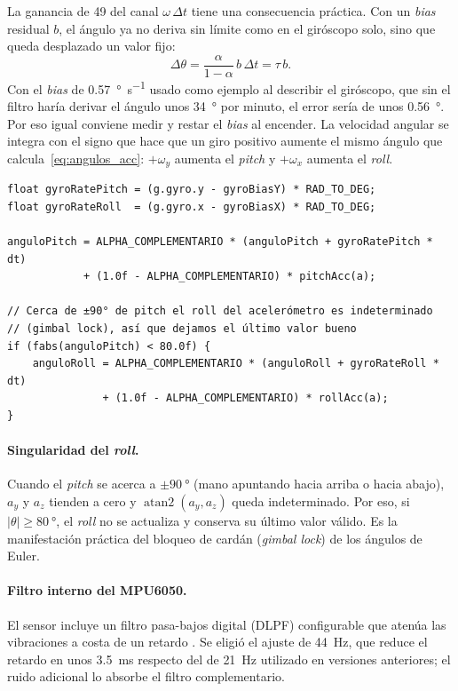 La ganancia de 49 del canal $\omega\,\Delta t$ tiene una consecuencia práctica. Con un \textit{bias} residual $b$, el ángulo ya no deriva sin límite como en el giróscopo solo, sino que queda desplazado un valor fijo:
\begin{equation}
\Delta\theta = \frac{\alpha}{1-\alpha}\,b\,\Delta t = \tau\, b .
\end{equation}
Con el \textit{bias} de \SI{0.57}{\degree\per\second} usado como ejemplo al describir el giróscopo, que sin el filtro haría derivar el ángulo unos \SI{34}{\degree} por minuto, el error sería de unos \SI{0.56}{\degree}. Por eso igual conviene medir y restar el \textit{bias} al encender. La velocidad angular se integra con el signo que hace que un giro positivo aumente el mismo ángulo que calcula~\eqref{eq:angulos_acc}: $+\omega_y$ aumenta el \textit{pitch} y $+\omega_x$ aumenta el \textit{roll}.

\begin{lstlisting}[caption={Filtro complementario en la tarea de transmisión.}, label={cod:complementario}]
float gyroRatePitch = (g.gyro.y - gyroBiasY) * RAD_TO_DEG;
float gyroRateRoll  = (g.gyro.x - gyroBiasX) * RAD_TO_DEG;

anguloPitch = ALPHA_COMPLEMENTARIO * (anguloPitch + gyroRatePitch * dt)
            + (1.0f - ALPHA_COMPLEMENTARIO) * pitchAcc(a);

// Cerca de ±90° de pitch el roll del acelerómetro es indeterminado
// (gimbal lock), así que dejamos el último valor bueno
if (fabs(anguloPitch) < 80.0f) {
    anguloRoll = ALPHA_COMPLEMENTARIO * (anguloRoll + gyroRateRoll * dt)
               + (1.0f - ALPHA_COMPLEMENTARIO) * rollAcc(a);
}
\end{lstlisting}

\paragraph{Singularidad del \textit{roll}.} Cuando el \textit{pitch} se acerca a $\pm\SI{90}{\degree}$ (mano apuntando hacia arriba o hacia abajo), $a_y$ y $a_z$ tienden a cero y $\operatorname{atan2}(a_y, a_z)$ queda indeterminado. Por eso, si $|\theta| \geq \SI{80}{\degree}$, el \textit{roll} no se actualiza y conserva su último valor válido. Es la manifestación práctica del bloqueo de cardán (\textit{gimbal lock}) de los ángulos de Euler.

\paragraph{Filtro interno del MPU6050.} El sensor incluye un filtro pasa-bajos digital (DLPF) configurable que atenúa las vibraciones a costa de un retardo \cite{mpu6050_regmap}. Se eligió el ajuste de \SI{44}{\hertz}, que reduce el retardo en unos \SI{3.5}{\milli\second} respecto del de \SI{21}{\hertz} utilizado en versiones anteriores; el ruido adicional lo absorbe el filtro complementario.

